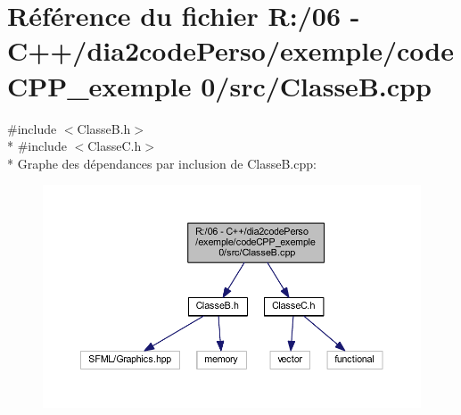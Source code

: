 \section{Référence du fichier R\+:/06 -\/ C++/dia2code\+Perso/exemple/code\+C\+P\+P\+\_\+exemple 0/src/\+Classe\+B.cpp}
\label{_classe_b_8cpp}
{\ttfamily \#include $<$Classe\+B.\+h$>$}\\*
{\ttfamily \#include $<$Classe\+C.\+h$>$}\\*
Graphe des dépendances par inclusion de Classe\+B.\+cpp\+:\nopagebreak
\begin{figure}[H]
\begin{center}
\leavevmode
\includegraphics[width=350pt]{_classe_b_8cpp__incl}
\end{center}
\end{figure}
